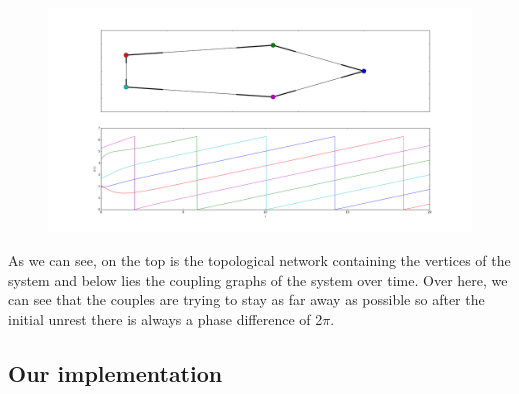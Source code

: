 \begin{figure}[h!]
\centering
\includegraphics[width=\linewidth]{imgs/examplefigure}
\caption{}
\end{figure}

As we can see, on the top is the topological network containing the vertices of the system and below lies the coupling graphs of the system over time. Over here, we can see that the couples are trying to stay as far away as possible so after the initial unrest there is always a phase difference of 2$\pi$. 


\subsection{Our implementation}

